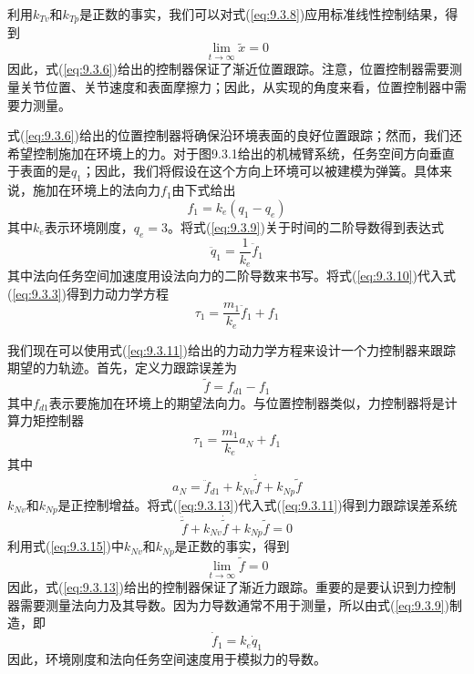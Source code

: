 \documentclass[12pt,a4paper]{ctexart}
\begin{document}
利用$k_{Tv}$和$k_{Tp}$是正数的事实，我们可以对式(\ref{eq:9.3.8})应用标准线性控制结果，得到
\[
\lim_{t \to \infty} \tilde{x} = 0
\]
因此，式(\ref{eq:9.3.6})给出的控制器保证了渐近位置跟踪。注意，位置控制器需要测量关节位置、关节速度和表面摩擦力；因此，从实现的角度来看，位置控制器中需要力测量。

式(\ref{eq:9.3.6})给出的位置控制器将确保沿环境表面的良好位置跟踪；然而，我们还希望控制施加在环境上的力。对于图9.3.1给出的机械臂系统，任务空间方向垂直于表面的是$q_1$；因此，我们将假设在这个方向上环境可以被建模为弹簧。具体来说，施加在环境上的法向力$f_1$由下式给出
\begin{equation}\label{eq:9.3.9}
f_1 = k_e(q_1 - q_e)
\end{equation}
其中$k_e$表示环境刚度，$q_e = 3$。将式(\ref{eq:9.3.9})关于时间的二阶导数得到表达式
\begin{equation}\label{eq:9.3.10}
\ddot{q}_1 = \frac{1}{k_e}\ddot{f}_1
\end{equation}
其中法向任务空间加速度用设法向力的二阶导数来书写。将式(\ref{eq:9.3.10})代入式(\ref{eq:9.3.3})得到力动力学方程
\begin{equation}\label{eq:9.3.11}
\tau_1 = \frac{m_1}{k_e}\ddot{f}_1 + f_1
\end{equation}

我们现在可以使用式(\ref{eq:9.3.11})给出的力动力学方程来设计一个力控制器来跟踪期望的力轨迹。首先，定义力跟踪误差为
\begin{equation}\label{eq:9.3.12}
\tilde{f} = f_{d1} - f_1
\end{equation}
其中$f_{d1}$表示要施加在环境上的期望法向力。与位置控制器类似，力控制器将是计算力矩控制器
\begin{equation}\label{eq:9.3.13}
\tau_1 = \frac{m_1}{k_e}a_N + f_1
\end{equation}
其中
\begin{equation}\label{eq:9.3.14}
a_N = \ddot{f}_{d1} + k_{Nv}\dot{\tilde{f}} + k_{Np}\tilde{f}
\end{equation}
$k_{Nv}$和$k_{Np}$是正控制增益。将式(\ref{eq:9.3.13})代入式(\ref{eq:9.3.11})得到力跟踪误差系统
\begin{equation}\label{eq:9.3.15}
\ddot{\tilde{f}} + k_{Nv}\dot{\tilde{f}} + k_{Np}\tilde{f} = 0
\end{equation}
利用式(\ref{eq:9.3.15})中$k_{Nv}$和$k_{Np}$是正数的事实，得到
\[
\lim_{t \to \infty} \tilde{f} = 0
\]
因此，式(\ref{eq:9.3.13})给出的控制器保证了渐近力跟踪。重要的是要认识到力控制器需要测量法向力及其导数。因为力导数通常不用于测量，所以由式(\ref{eq:9.3.9})制造，即
\begin{equation}\label{eq:9.3.16}
\dot{f}_1 = k_e\dot{q}_1
\end{equation}
因此，环境刚度和法向任务空间速度用于模拟力的导数。
\end{document}
